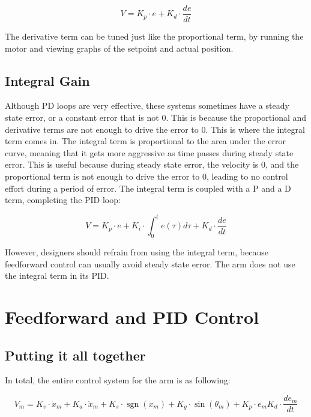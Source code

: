 \documentclass{scrartcl}
\DeclareMathOperator{\sgn}{sgn}
\begin{document}
\begin{equation} \label{PD Loop}
    V = K_p \cdot e + K_d \cdot \frac{de}{dt}
\end{equation}

The derivative term can be tuned just like the proportional term, by running the motor and viewing graphs of the setpoint and actual position.

\subsection{Integral Gain}
Although PD loops are very effective, these systems sometimes have a steady state error, or a constant error that is not 0. This is because the proportional and derivative terms are not enough to drive the error to 0. This is where the integral term comes in. The integral term is proportional to the area under the error curve, meaning that it gets more aggressive as time passes during steady state error. This is useful because during steady state error, the velocity is 0, and the proportional term is not enough to drive the error to 0, leading to no control effort during a period of error. The integral term is coupled with a P and a D term, completing the PID loop:

\begin{equation}
    V = K_p \cdot e + K_i \cdot \int_{0}^{t} e(\tau) d\tau + K_d \cdot \frac{de}{dt}
\end{equation}

However, designers should refrain from using the integral term, because feedforward control can usually avoid steady state error. The arm does not use the integral term in its PID.

\section{Feedforward and PID Control}

\subsection{Putting it all together}
In total, the entire control system for the arm is as following:

\begin{equation} \label{Pivot Control Equation}
    V_{m} = K_v \cdot \dot{x}_{m} + K_a \cdot \ddot{x}_{m} + K_s \cdot \sgn(\dot{x}_{m}) + K_g \cdot \sin(\theta_{m}) + K_p \cdot e_{m} K_d \cdot \frac{de_{m}}{dt}
\end{equation}
\end{document}
